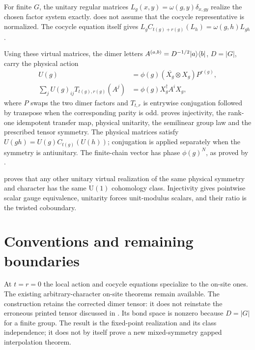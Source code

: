 \documentclass{article}
\begin{document}
For finite $G$, the unitary regular matrices
$L_g(x,y)=\omega(g,y)\delta_{x,gy}$ realize the chosen factor system exactly.
 does not assume
that the cocycle representative is normalized. The cocycle equation itself
gives $L_gC_{t(g)+r(g)}(L_h)=\omega(g,h)L_{gh}$.

Using these virtual matrices, the dimer letters
$A^{(a,b)}=D^{-1/2}|a\rangle\langle b|$, $D=|G|$, carry the physical action
\begin{align}
    U(g) & =\phi(g)(\overline{X_g}\otimes X_g)P^{r(g)}, \\
    \sum_j U(g)_{ij}T_{t(g),r(g)}(A^j)
         & =\phi(g)X_g^\dagger A^iX_g,
    \label{eq:rmp_spt_onsite_scope_twist}
\end{align}
where $P$ swaps the two dimer factors and $T_{t,r}$ is entrywise conjugation
followed by transpose when the corresponding parity is odd.
 proves injectivity, the
rank-one idempotent transfer map, physical unitarity, the semilinear group
law and the prescribed tensor symmetry. The physical matrices satisfy
$U(gh)=U(g)C_{t(g)}(U(h))$; conjugation is applied separately when the
symmetry is antiunitary. The finite-chain vector has phase $\phi(g)^N$, as
proved by .

 proves that
any other unitary virtual realization of the same physical symmetry and
character has the same $\mathrm U(1)$ cohomology class. Injectivity gives
pointwise scalar gauge equivalence, unitarity forces unit-modulus scalars,
and their ratio is the twisted coboundary.

\section{Conventions and remaining boundaries}
At $t=r=0$ the local action and cocycle equations specialize to the on-site
ones. The existing arbitrary-character on-site theorems remain available.
The construction retains the corrected dimer tensor: it does not reinstate
the erroneous printed tensor discussed in
\cite{gap:rmp_spt_fixed_point_tensor}. Its bond space is nonzero because
$D=|G|$ for a finite group. The result is the fixed-point realization and its
class independence; it does not by itself prove a new mixed-symmetry gapped
interpolation theorem.



\end{document}
